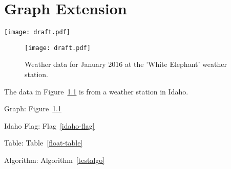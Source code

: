 
\chapter{\label{graph-extension}Graph Extension}
\par
\texttt{[image: draft.pdf]}
\begin{figure}
\caption{\label{white-elephant}Weather data for January 2016 at the 'White Elephant' weather station.}
\par
\texttt{[image: draft.pdf]}
\end{figure}

\par The data in Figure~\ref{white-elephant} is from a weather station in Idaho.
\par Graph: Figure~\ref{white-elephant}
\par Idaho Flag: Flag~\ref{idaho-flag}
\par Table: Table~\ref{float-table}
\par Algorithm: Algorithm~\ref{testalgo} 
